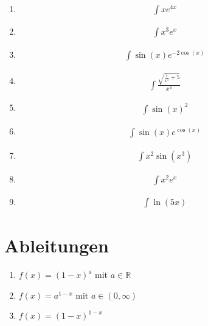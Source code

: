 \documentclass{article}
\begin{document}
\begin{multicols}{4}
\begin{enumerate}
    \item \begin{align*}
        \int x e^{4x}
    \end{align*}
    \item \begin{align*}
        \int x^3e^x
    \end{align*}
    \item \begin{align*}
        \int \sin(x) e^{-2\cos(x)}
    \end{align*}
    \item \begin{align*}
        \int \frac{\sqrt{\frac{1}{x^3} + 5}}{x^4}
    \end{align*}
    \item \begin{align*}\int \sin(x)^2\end{align*}
    \item \begin{align*}\int \sin(x)e^{\cos(x)}\end{align*}
    \item \begin{align*}
        \int x^2 \sin(x^3)
    \end{align*}
    \item \begin{align*}
        \int x^2 e^x
    \end{align*}
    \item \begin{align*}
        \int \ln(5x)
    \end{align*}
\end{enumerate}
\end{multicols}

\section*{Ableitungen}

\begin{multicols}{2}
\begin{enumerate}
    \item $f(x) = (1-x)^a$ mit $a \in \mathbb{R}$
    \item $f(x) = a^{1-x}$ mit $a \in (0, \infty)$
    \item $f(x) = (1 - x)^{1 - x}$
\end{enumerate}
\end{multicols}
\end{document}
